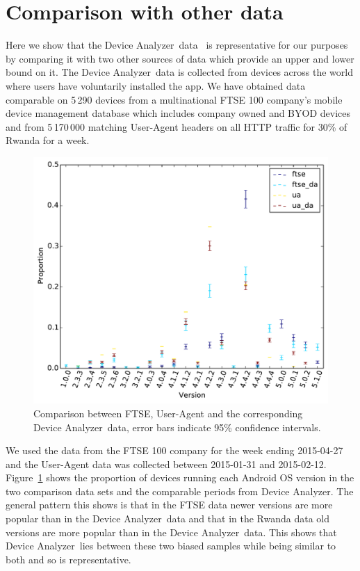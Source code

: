 \documentclass{sig-alternate}
\newcommand{\da}{Device Analyzer}
\begin{document}
\section{Comparison with other data}
Here we show that the \da\ data~\cite{Wagner2013} is representative for our purposes by comparing it with two other sources of data which provide an upper and lower bound on it.
The \da\ data is collected from devices across the world where users have voluntarily installed the app.
We have obtained data comparable on 5\,290 devices from a multinational FTSE 100 company's mobile device management database which includes company owned and BYOD devices and from 5\,170\,000 matching User-Agent headers on all HTTP traffic for 30\% of Rwanda for a week.
\begin{figure}
\centering
\includegraphics[width=\columnwidth]{figures/dists}
\caption{Comparison between FTSE, User-Agent and the corresponding \da\ data, error bars indicate 95\% confidence intervals.}
\label{fig:dists}
\end{figure}
We used the data from the FTSE 100 company for the week ending 2015-04-27 and the User-Agent data was collected between 2015-01-31 and 2015-02-12.
Figure~\ref{fig:dists} shows the proportion of devices running each Android OS version in the two comparison data sets and the comparable periods from \da.
The general pattern this shows is that in the FTSE data newer versions are more popular than in the \da\ data and that in the Rwanda data old versions are more popular than in the \da\ data.
This shows that \da\ lies between these two biased samples while being similar to both and so is representative.
\end{document}
